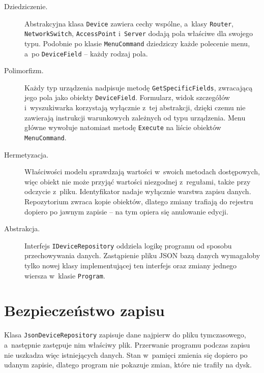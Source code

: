 \begin{description}
	\item[Dziedziczenie.] Abstrakcyjna klasa \texttt{Device} zawiera cechy wspólne, a~klasy \texttt{Router}, \texttt{NetworkSwitch}, \texttt{AccessPoint} i~\texttt{Server} dodają pola właściwe dla swojego typu. Podobnie po klasie \texttt{MenuCommand} dziedziczy każde polecenie menu, a~po \texttt{DeviceField} -- każdy rodzaj pola.
	\item[Polimorfizm.] Każdy typ urządzenia nadpisuje metodę \texttt{GetSpecificFields}, zwracającą jego pola jako obiekty \texttt{DeviceField}. Formularz, widok szczegółów i~wyszukiwarka korzystają wyłącznie z~tej abstrakcji, dzięki czemu nie zawierają instrukcji warunkowych zależnych od typu urządzenia. Menu główne wywołuje natomiast metodę \texttt{Execute} na liście obiektów \texttt{MenuCommand}.
	\item[Hermetyzacja.] Właściwości modelu sprawdzają wartości w~swoich metodach dostępowych, więc obiekt nie może przyjąć wartości niezgodnej z~regułami, także przy odczycie z~pliku. Identyfikator nadaje wyłącznie warstwa zapisu danych. Repozytorium zwraca kopie obiektów, dlatego zmiany trafiają do rejestru dopiero po jawnym zapisie -- na tym opiera się anulowanie edycji.
	\item[Abstrakcja.] Interfejs \texttt{IDeviceRepository} oddziela logikę programu od sposobu przechowywania danych. Zastąpienie pliku JSON bazą danych wymagałoby tylko nowej klasy implementującej ten interfejs oraz zmiany jednego wiersza w~klasie \texttt{Program}.
\end{description}

\section{Bezpieczeństwo zapisu}

Klasa \texttt{JsonDeviceRepository} zapisuje dane najpierw do pliku tymczasowego, a~następnie zastępuje nim właściwy plik. Przerwanie programu podczas zapisu nie uszkadza więc istniejących danych. Stan w~pamięci zmienia się dopiero po udanym zapisie, dlatego program nie pokazuje zmian, które nie trafiły na dysk.

